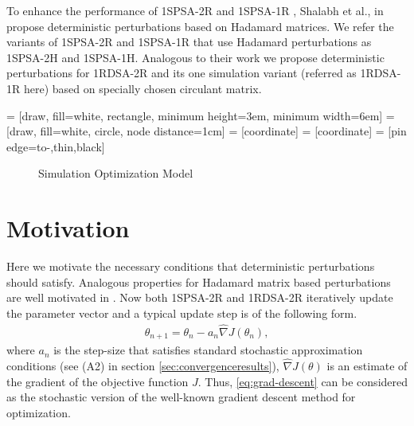 \documentclass[letterpaper, 10 pt, conference]{ieeeconf}  %
\begin{document}
To enhance the performance of 1SPSA-2R and 1SPSA-1R , Shalabh et al., in
\cite{bhatnagar2003two} propose deterministic perturbations based on Hadamard matrices.
We refer the variants of 1SPSA-2R and 1SPSA-1R that use Hadamard perturbations as
1SPSA-2H and 1SPSA-1H. Analogous to their work we propose deterministic perturbations
for 1RDSA-2R and its  one simulation variant (referred as 1RDSA-1R here) based on 
specially chosen circulant matrix.

 = [draw, fill=white, rectangle,
   minimum height=3em, minimum width=6em]
 = [draw, fill=white, circle, node distance=1cm]
 = [coordinate]
 = [coordinate]
 = [pin edge={to-,thin,black}]

\begin{figure}[t]
    \centering
{}
\caption{Simulation Optimization Model}
\label{fig:so}
\end{figure}

\section{Motivation}
Here we motivate the necessary conditions that deterministic perturbations should satisfy.
Analogous properties for Hadamard matrix based perturbations are well motivated in 
\cite{bhatnagar-book}.
Now both 1SPSA-2R and 1RDSA-2R iteratively update the parameter vector and a typical update step
is of the following form.
\begin{align}
\label{eq:grad-descent}
\theta_{n+1} = \theta_n - a_n \widehat\nabla J(\theta_n), 
\end{align}
where $a_n$ is the step-size that satisfies standard stochastic approximation 
conditions (see (A2) in section \ref{sec:convergenceresults}), $\widehat\nabla 
J(\theta)$ is an estimate of the gradient of the objective function $J$.
Thus, \eqref{eq:grad-descent} can be considered as 
the stochastic version of the well-known gradient descent method for optimization. 
\end{document}

